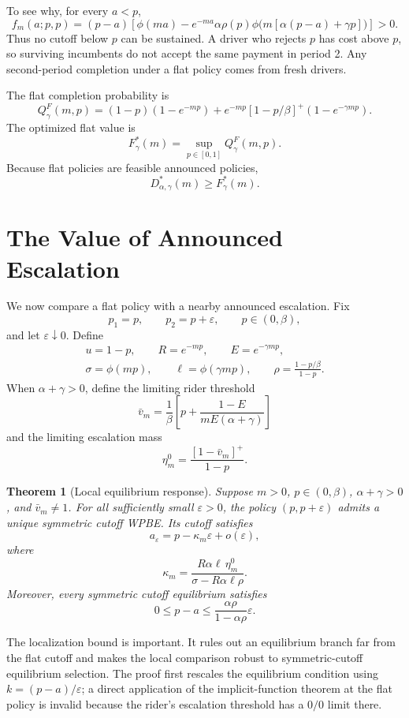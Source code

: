 \documentclass[11pt]{article}
\newtheorem{theorem}{Theorem}
\theoremstyle{definition}
\theoremstyle{remark}
\begin{document}
To see why, for every \(a<p\),
\[
f_m(a;p,p)
=(p-a)\left[
\phi(ma)-e^{-ma}\alpha\rho(p)
\phi\bigl(m[\alpha(p-a)+\gamma p]\bigr)
\right]>0.
\]
Thus no cutoff below \(p\) can be sustained.  A driver who rejects \(p\) has
cost above \(p\), so surviving incumbents do not accept the same payment in
period 2.  Any second-period completion under a flat policy comes from fresh
drivers.

The flat completion probability is
\[
  Q_\gamma^F(m,p)
  =
  (1-p)(1-e^{-mp})
  +
  e^{-mp}[1-p/\beta]^+(1-e^{-\gamma mp}).
\]
The optimized flat value is
\[
  F_\gamma^*(m)
  =
  \sup_{p\in[0,1]}Q_\gamma^F(m,p).
\]
Because flat policies are feasible announced policies,
\[
  D_{\alpha,\gamma}^*(m)\ge F_\gamma^*(m).
\]

\section{The Value of Announced Escalation}
\label{sec:value}

We now compare a flat policy with a nearby announced escalation.  Fix
\[
  p_1=p,\qquad p_2=p+\varepsilon,
  \qquad p\in(0,\beta),
\]
and let \(\varepsilon\downarrow0\).  Define
\[
\begin{gathered}
u=1-p,\qquad
R=e^{-mp},\qquad
E=e^{-\gamma mp},\\
\sigma=\phi(mp),\qquad
\ell=\phi(\gamma mp),\qquad
\rho=\frac{1-p/\beta}{1-p}.
\end{gathered}
\]
When \(\alpha+\gamma>0\), define the limiting rider threshold
\[
  \bar v_m
  =
  \frac1\beta\left[
  p+\frac{1-E}{mE(\alpha+\gamma)}
  \right]
\]
and the limiting escalation mass
\[
  \eta_m^0
  =
  \frac{[1-\bar v_m]^+}{1-p}.
\]

\begin{theorem}[Local equilibrium response]
\label{thm:local}
Suppose \(m>0\), \(p\in(0,\beta)\), \(\alpha+\gamma>0\), and
\(\bar v_m\ne1\).  For all sufficiently small \(\varepsilon>0\), the policy
\((p,p+\varepsilon)\) admits a unique symmetric cutoff WPBE.  Its cutoff
satisfies
\[
  a_\varepsilon
  =
  p-\kappa_m\varepsilon+o(\varepsilon),
\]
where
\[
  \kappa_m
  =
  \frac{R\alpha\ell\,\eta_m^0}
       {\sigma-R\alpha\ell\rho}.
\]
Moreover, every symmetric cutoff equilibrium satisfies
\[
  0\le p-a
  \le
  \frac{\alpha\rho}{1-\alpha\rho}\varepsilon.
\]
\end{theorem}

The localization bound is important.  It rules out an equilibrium branch far
from the flat cutoff and makes the local comparison robust to symmetric-cutoff
equilibrium selection.  The proof first rescales the equilibrium condition
using \(k=(p-a)/\varepsilon\); a direct application of the implicit-function
theorem at the flat policy is invalid because the rider's escalation threshold
has a \(0/0\) limit there.
\end{document}
